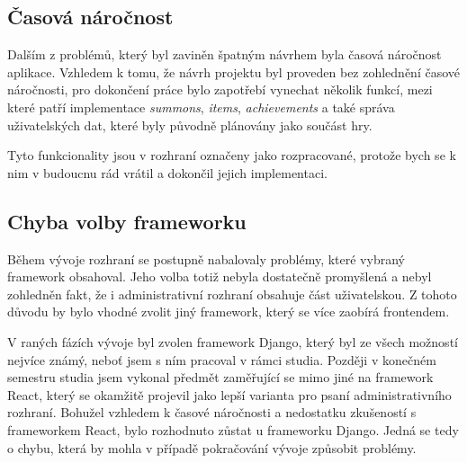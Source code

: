 \subsection*{Časová náročnost}
\label{subsec:implementation-problems-time}
Dalším z problémů, který byl zaviněn špatným návrhem byla časová náročnost aplikace. Vzhledem k tomu, že návrh projektu byl proveden bez zohlednění časové náročnosti, pro dokončení práce bylo zapotřebí vynechat několik funkcí, mezi které patří implementace \textit{summons}, \textit{items}, \textit{achievements} a také správa uživatelských dat, které byly původně plánovány jako součást hry.

Tyto funkcionality jsou v rozhraní označeny jako rozpracované, protože bych se k nim v budoucnu rád vrátil a dokončil jejich implementaci.

\subsection*{Chyba volby frameworku}
\label{subsec:implementation-problems-framework}
Během vývoje rozhraní se postupně nabalovaly problémy, které vybraný framework obsahoval. Jeho volba totiž nebyla dostatečně promyšlená a nebyl zohledněn fakt, že i administrativní rozhraní obsahuje část uživatelskou. Z tohoto důvodu by bylo vhodné zvolit jiný framework, který se více zaobírá frontendem.

V raných fázích vývoje byl zvolen framework Django, který byl ze všech možností nejvíce známý, neboť jsem s ním pracoval v rámci studia. Později v konečném semestru studia jsem vykonal předmět zaměřující se mimo jiné na framework React, který se okamžitě projevil jako lepší varianta pro psaní administrativního rozhraní. Bohužel vzhledem k časové náročnosti a nedostatku zkušeností s frameworkem React, bylo rozhodnuto zůstat u frameworku Django. Jedná se tedy o chybu, která by mohla v případě pokračování vývoje způsobit problémy.

\endinput